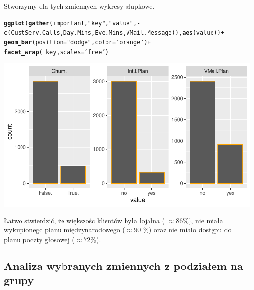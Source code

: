 \documentclass{article}\usepackage[]{graphicx}\usepackage[]{color}
\makeatletter
\def\maxwidth{ %
  \ifdim\Gin@nat@width>\linewidth
    \linewidth
  \else
    \Gin@nat@width
  \fi
}
\newcommand{\hlstr}[1]{\textcolor[rgb]{0.192,0.494,0.8}{#1}}%
\newcommand{\hlopt}[1]{\textcolor[rgb]{0,0,0}{#1}}%
\newcommand{\hlstd}[1]{\textcolor[rgb]{0.345,0.345,0.345}{#1}}%
\newcommand{\hlkwc}[1]{\textcolor[rgb]{0.333,0.667,0.333}{#1}}%
\newcommand{\hlkwd}[1]{\textcolor[rgb]{0.737,0.353,0.396}{\textbf{#1}}}%
\newenvironment{kframe}{%
 \def\at@end@of@kframe{}%
 \ifinner\ifhmode%
  \def\at@end@of@kframe{\end{minipage}}%
  \begin{minipage}{\columnwidth}%
 \fi\fi%
 \def\FrameCommand##1{\hskip\@totalleftmargin \hskip-\fboxsep
 \colorbox{shadecolor}{##1}\hskip-\fboxsep
     \hskip-\linewidth \hskip-\@totalleftmargin \hskip\columnwidth}%
 \MakeFramed {\advance\hsize-\width
   \@totalleftmargin\z@ \linewidth\hsize
   \@setminipage}}%
 {\par\unskip\endMakeFramed%
 \at@end@of@kframe}
\newenvironment{knitrout}{}{} %
\makeatother
\begin{document}
Stworzymy dla tych zmiennych wykresy słupkowe.
\begin{knitrout}
\color{fgcolor}\begin{kframe}
\begin{alltt}
\hlkwd{ggplot}\hlstd{(}\hlkwd{gather}\hlstd{(important,} \hlstr{"key"}\hlstd{,} \hlstr{"value"}\hlstd{,} \hlopt{-}\hlkwd{c}\hlstd{(CustServ.Calls, Day.Mins, Eve.Mins, VMail.Message)),} \hlkwd{aes}\hlstd{(value))} \hlopt{+}
  \hlkwd{geom_bar}\hlstd{(}\hlkwc{position}\hlstd{=}\hlstr{"dodge"}\hlstd{,} \hlkwc{color}\hlstd{=}\hlstr{'orange'}\hlstd{)} \hlopt{+}
  \hlkwd{facet_wrap}\hlstd{(}\hlopt{~}\hlstd{key,} \hlkwc{scales}\hlstd{=}\hlstr{'free'}\hlstd{)}
\end{alltt}
\end{kframe}

{\centering \includegraphics[width=\maxwidth]{figure/Wykresy_slupkowe_dla_wybranych_zmiennych-1} 

}



\end{knitrout}
Łatwo stwierdzić, że większośc klientów była lojalna ( $\approx 86$\%), nie miała wykupionego planu międzynarodowego ($\approx 90$ \%) oraz nie miało dostępu do planu poczty głosowej ($\approx 72$\%).  

\subsection{Analiza wybranych zmiennych z podziałem na grupy}
\end{document}
